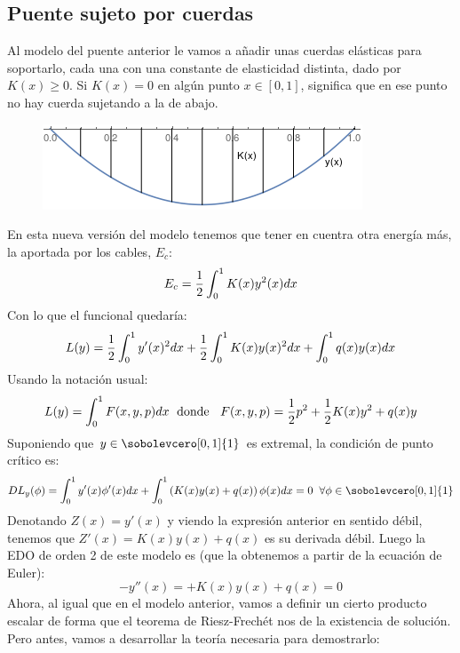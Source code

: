 \subsection{Puente sujeto por cuerdas}

Al modelo del puente anterior le vamos a añadir unas cuerdas elásticas para soportarlo, cada una con una constante de elasticidad distinta, dado por $K(x)\geq 0$.
Si $K(x)=0$ en algún punto $x\in[0,1]$, significa que en ese punto no hay cuerda sujetando a la de abajo.
\begin{figure}[H]
   \center
  \includegraphics[scale=0.6]{img/puentecuerdas.png}
\end{figure}
En esta nueva versión del modelo tenemos que tener en cuentra otra energía más, la aportada por los cables, $E_c$:
\[
E_c=\frac{1}{2}\displaystyle\int_{ 0 }^{ 1 } K(x)y^2(x)dx
\]
Con lo que el funcional quedaría:
\[
L(y)=\frac{1}{2}\displaystyle\int_{ 0 }^{ 1 } y'(x)^2dx+\frac{1}{2}\displaystyle\int_{ 0 }^{ 1 } K(x)y(x)^2dx+\displaystyle\int_{ 0 }^{ 1 } q(x)y(x)dx
\]
Usando la notación usual:
\begin{equation}\label{funcionalpuente}
L(y)=\displaystyle\int_{ 0 }^{ 1 } F(x,y,p)dx \; \text{ donde } \;\; F(x,y,p)=\frac{1}{2}p^2+\frac{1}{2}K(x)y^2+q(x)y
\end{equation}
Suponiendo que $y\in\sobolevcero[0,1]{1}$ es extremal, la condición de punto crítico es:
\[
DL_y(\phi)=\integral{0}{1}{y'(x)\phi'(x)dx}+\integral{0}{1}{\left(K(x)y(x)+q(x)\right)\phi(x)dx}=0 \;\; \forall \phi\in\sobolevcero[0,1]{1}
\]
Denotando $Z(x)=y'(x)$ y viendo la expresión anterior en sentido débil, tenemos que $Z'(x)=K(x)y(x)+q(x)$ es su derivada débil. Luego la EDO de orden 2 de este modelo es (que la obtenemos a partir de la ecuación de Euler):
\[
-y''(x)=+K(x)y(x)+q(x)=0
\]
Ahora, al igual que en el modelo anterior, vamos a definir un cierto producto escalar de forma que el teorema de Riesz-Frechét nos de la existencia de solución. Pero antes, vamos a desarrollar la teoría necesaria para demostrarlo:

